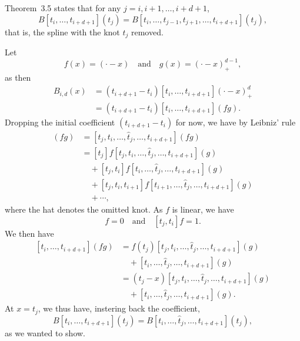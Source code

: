 \begin{solution}
    Theorem~3.5 states that for any $j = i, i + 1, \ldots , i + d + 1$,
    \begin{equation*}
        B[t_i, \ldots, t_{i+d+1}](t_j) =
        B[t_i, \ldots, t_{j-1}, t_{j+1}, \ldots, t_{i+d+1}](t_j),
    \end{equation*}
    that is, the spline with the knot $t_j$ removed.

    Let
    \begin{equation*}
        f(x) = (\cdot - x)
        \quad \text{and} \quad
        g(x) = (\cdot - x)_+^{d-1},
    \end{equation*}
    as then
    \begin{equation*}
        \begin{split}
            B_{i,d}(x) &= (t_{i+d+1} - t_i) [t_i, \ldots, t_{i+d+1}](\cdot - x)_+^d \\
            &= (t_{i+d+1} - t_i) [t_i, \ldots, t_{i+d+1}](fg).
        \end{split}
    \end{equation*}
    Dropping the initial coefficient $(t_{i+d+1} - t_i)$ for now, we have by Leibniz' rule
    \begin{align*}
        [t_i, \ldots, t_{i+d+1}](fg)
        &= [t_j, t_i, \ldots, \hat{t}_j, \ldots, t_{i+d+1}](fg) \\
        &= [t_j]f [t_j, t_i, \ldots, \hat{t}_j, \ldots, t_{i+d+1}](g) \\
        &\quad + [t_j, t_i]f [t_i, \ldots, \hat{t}_j, \ldots, t_{i+d+1}](g) \\
        &\quad + [t_j, t_i, t_{i+1}]f [t_{i+1}, \ldots, \hat{t}_j, \ldots, t_{i+d+1}](g) \\
        &\quad + \cdots,
    \end{align*}
    where the hat denotes the omitted knot.
    As $f$ is linear, we have
    \begin{equation*}
        [\underbrace{t_j, t_i, \ldots, t_k}_{\geq 3}]f = 0
        \quad \text{and} \quad
        [t_j, t_i]f = 1.
    \end{equation*}
    We then have
    \begin{equation*}
        \begin{split}
            [t_i, \ldots, t_{i+d+1}](fg) &= f(t_j) [t_j, t_i, \ldots, \hat{t}_j, \ldots, t_{i+d+1}](g) \\
            &\quad + [t_i, \ldots, \hat{t}_j, \ldots, t_{i+d+1}](g) \\
            &= (t_j - x) [t_j, t_i, \ldots, \hat{t}_j, \ldots, t_{i+d+1}](g) \\
            &\quad + [t_i, \ldots, \hat{t}_j, \ldots, t_{i+d+1}](g).
        \end{split}
    \end{equation*}
    At $x = t_j$, we thus have, instering back the coefficient,
    \begin{equation*}
        B[t_i, \ldots, t_{i+d+1}](t_j) =
        B[t_i, \ldots, \hat{t}_j, \ldots, t_{i+d+1}](t_j),
    \end{equation*}
    as we wanted to show.


\end{solution}
